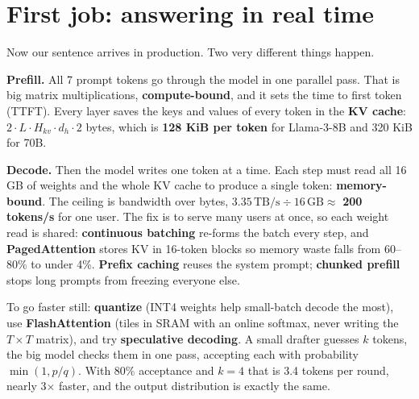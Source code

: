 \documentclass[10pt,a4paper]{extarticle}
\newcommand{\hl}[1]{{\color{acc2}\textbf{#1}}}
\begin{document}
\begin{center}
\end{center}

\vspace{2mm}\section{First job: answering in real time}
Now our sentence arrives in production. Two very different things happen.

\textbf{Prefill.} All 7 prompt tokens go through the model in one parallel pass. That is big matrix multiplications, \hl{compute-bound}, and it sets the time to first token (TTFT). Every layer saves the keys and values of every token in the \hl{KV cache}: $2\cdot L\cdot H_{kv}\cdot d_h\cdot2$ bytes, which is \hl{128 KiB per token} for Llama-3-8B and 320 KiB for 70B.

\textbf{Decode.} Then the model writes one token at a time. Each step must read all 16 GB of weights and the whole KV cache to produce a single token: \hl{memory-bound}. The ceiling is bandwidth over bytes, $3.35\,\text{TB/s}\div16\,\text{GB}\approx$ \hl{200 tokens/s} for one user. The fix is to serve many users at once, so each weight read is shared: \hl{continuous batching} re-forms the batch every step, and \hl{PagedAttention} stores KV in 16-token blocks so memory waste falls from 60--80\% to under 4\%. \hl{Prefix caching} reuses the system prompt; \hl{chunked prefill} stops long prompts from freezing everyone else.

To go faster still: \hl{quantize} (INT4 weights help small-batch decode the most), use \hl{FlashAttention} (tiles in SRAM with an online softmax, never writing the $T{\times}T$ matrix), and try \hl{speculative decoding}. A small drafter guesses $k$ tokens, the big model checks them in one pass, accepting each with probability $\min(1,p/q)$. With 80\% acceptance and $k=4$ that is 3.4 tokens per round, nearly 3$\times$ faster, and the output distribution is exactly the same.
\end{document}
